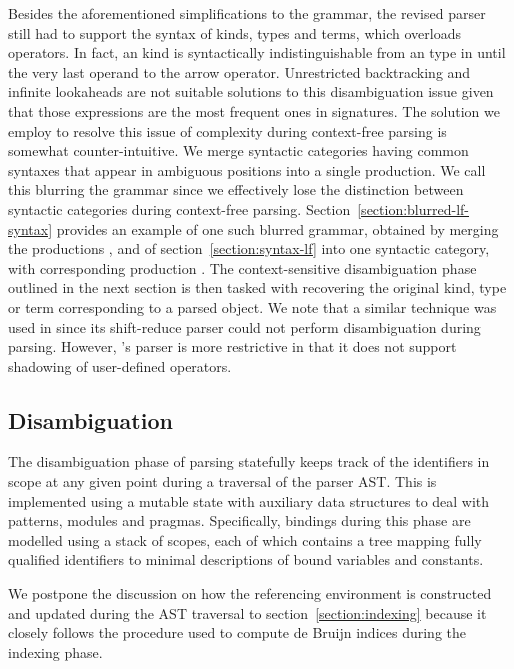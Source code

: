 Besides the aforementioned simplifications to the grammar, the revised parser still had to support the syntax of \LF kinds, types and terms, which overloads operators.
In fact, an \LF kind is syntactically indistinguishable from an \LF type in \Beluga until the very last operand to the arrow operator.
Unrestricted backtracking and infinite lookaheads are not suitable solutions to this disambiguation issue given that those expressions are the most frequent ones in \Beluga signatures.
The solution we employ to resolve this issue of complexity during context-free parsing is somewhat counter-intuitive.
We merge syntactic categories having common syntaxes that appear in ambiguous positions into a single production.
We call this blurring the grammar since we effectively lose the distinction between syntactic categories during context-free parsing.
Section~\ref{section:blurred-lf-syntax} provides an example of one such blurred grammar, obtained by merging the productions ,  and  of section~\ref{section:syntax-lf} into one syntactic category, with corresponding production .
The context-sensitive disambiguation phase outlined in the next section is then tasked with recovering the original \LF kind, type or term corresponding to a parsed \LF object.
We note that a similar technique was used in \Twelf since its shift-reduce parser could not perform disambiguation during parsing.
However, \Twelf's parser is more restrictive in that it does not support shadowing of user-defined operators.

\subsection{Disambiguation}

The disambiguation phase of parsing statefully keeps track of the identifiers in scope at any given point during a traversal of the parser \ac{AST}.
This is implemented using a mutable state with auxiliary data structures to deal with patterns, modules and pragmas.
Specifically, bindings during this phase are modelled using a stack of scopes, each of which contains a tree mapping fully qualified identifiers to minimal descriptions of bound variables and constants.

We postpone the discussion on how the referencing environment is constructed and updated during the \ac{AST} traversal to section~\ref{section:indexing} because it closely follows the procedure used to compute de Bruijn indices during the indexing phase.

